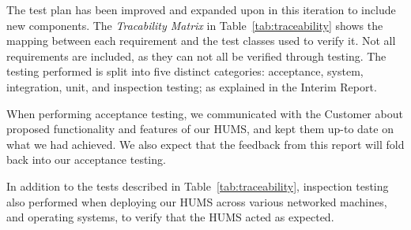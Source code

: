 \documentclass[10pt,a4paper]{article}
\begin{document}
The test plan has been improved and expanded upon in this iteration to include new components. The \emph{Tracability Matrix} in Table~\ref{tab:traceability} shows the mapping between each requirement and the test classes used to verify it. Not all requirements are included, as they can not all be verified through testing. The testing performed is split into five distinct categories: acceptance, system, integration, unit, and inspection testing; as explained in the Interim Report. 

When performing acceptance testing, we communicated with the Customer about proposed functionality and features of our HUMS, and kept them up-to date on what we had achieved. We also expect that the feedback from this report will fold back into our acceptance testing. 

In addition to the tests described in Table~\ref{tab:traceability}, inspection testing also performed when deploying our HUMS across various networked machines, and operating systems, to verify that the HUMS acted as expected. 
\end{document}
